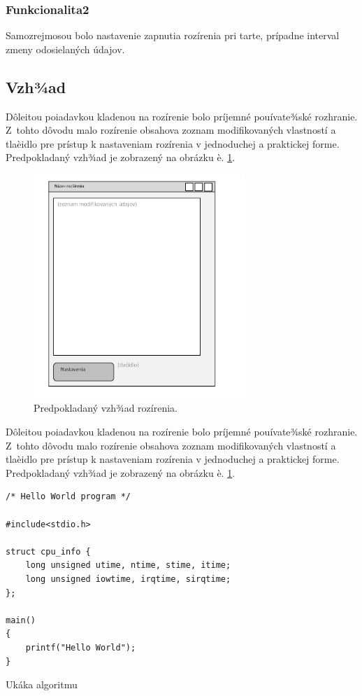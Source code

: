 \subsubsection{Funkcionalita2}
\noindent Samozrejmosou bolo nastavenie zapnutia rozírenia pri tarte, prípadne interval zmeny odosielaných údajov.

\subsection{Vzh¾ad}
\noindent Dôleitou poiadavkou kladenou na rozírenie bolo príjemné pouívate¾ské rozhranie. Z~tohto dôvodu malo rozírenie obsahova zoznam modifikovaných vlastností a tlaèidlo pre prístup k nastaveniam rozírenia v jednoduchej a praktickej forme. Predpokladaný vzh¾ad je zobrazený na obrázku è. \ref{vzhladobr}.
\begin{figure}[!htbp]
  \centering
  \includegraphics[width=8cm]{img/vzhlad.png}
  \caption{Predpokladaný vzh¾ad rozírenia.}
  \label{vzhladobr}
\end{figure}	 
\noindent Dôleitou poiadavkou kladenou na rozírenie bolo príjemné pouívate¾ské rozhranie.\cite{anonlib} Z~tohto dôvodu malo rozírenie obsahova zoznam modifikovaných vlastností a tlaèidlo pre prístup k nastaveniam rozírenia v jednoduchej a praktickej forme. Predpokladaný vzh¾ad je zobrazený na obrázku è. \ref{vzhladobr}.

\begin{algorithm}
%
\begin{lstlisting}
/* Hello World program */

#include<stdio.h>

struct cpu_info {
    long unsigned utime, ntime, stime, itime;
    long unsigned iowtime, irqtime, sirqtime;
};

main()
{
    printf("Hello World");
}\end{lstlisting}
 \caption{Ukáka algoritmu}
 \label{euclid}
\end{algorithm}